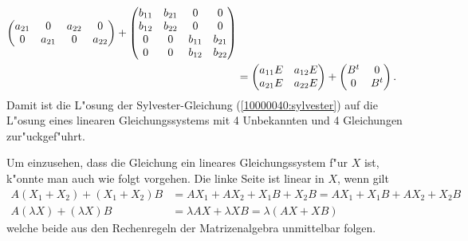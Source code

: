 \begin{loesung}
\begin{align}
\begin{pmatrix}
a_{21}&     0&a_{22}&     0\\
     0&a_{21}&     0&a_{22}
\end{pmatrix}
+
\begin{pmatrix}
b_{11}&b_{21}&     0&     0\\
b_{12}&b_{22}&     0&     0\\
     0&     0&b_{11}&b_{21}\\
     0&     0&b_{12}&b_{22}
\end{pmatrix}
\notag
\\
&=
\begin{pmatrix}
a_{11}E&a_{12}E\\
a_{21}E&a_{22}E
\end{pmatrix}
+
\begin{pmatrix}
B^t&0\\
0&B^t
\end{pmatrix}.
\label{10000040:matrix}
\end{align}
Damit ist die L"osung der Sylvester-Gleichung (\ref{10000040:sylvester}) auf 
die L"osung eines linearen Gleichungssystems mit 4 Unbekannten und 4 Gleichungen
zur"uckgef"uhrt.

Um einzusehen, dass die Gleichung ein lineares Gleichungssystem f"ur $X$ ist,
k"onnte man auch wie folgt vorgehen.
Die linke Seite ist linear in $X$, wenn gilt
\begin{align*}
A(X_1+X_2)+(X_1+X_2)B&=AX_1+AX_2+X_1B+X_2B=AX_1+X_1B + AX_2+X_2B\\
A(\lambda X)+(\lambda X)B&=\lambda AX+\lambda XB=\lambda(AX+XB)
\end{align*}
welche beide aus den Rechenregeln der Matrizenalgebra unmittelbar folgen.
\end{loesung}

